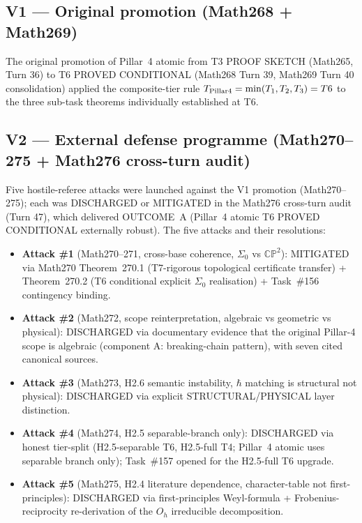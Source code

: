 \subsection{V1 — Original promotion (Math268 + Math269)}

The original promotion of Pillar~4 atomic from T3 PROOF SKETCH
(Math265, Turn 36) to T6 PROVED CONDITIONAL (Math268 Turn 39,
Math269 Turn 40 consolidation) applied the composite-tier rule
$T_{\rm Pillar4} = \min(T_1, T_2, T_3) = T6$ to the three sub-task
theorems individually established at T6.

\subsection{V2 — External defense programme (Math270--275 +
Math276 cross-turn audit)}

Five hostile-referee attacks were launched against the V1 promotion
(Math270--275); each was DISCHARGED or MITIGATED in the Math276
cross-turn audit (Turn 47), which delivered OUTCOME~A (Pillar~4
atomic T6 PROVED CONDITIONAL externally robust). The five attacks
and their resolutions:
\begin{itemize}
\item \textbf{Attack \#1} (Math270--271, cross-base coherence,
$\Sigma_0$ vs $\mathbb{CP}^2$): MITIGATED via Math270
Theorem~270.1 (T7-rigorous topological certificate transfer) +
Theorem~270.2 (T6 conditional explicit $\Sigma_0$ realisation) +
Task~\#156 contingency binding.
\item \textbf{Attack \#2} (Math272, scope reinterpretation,
algebraic vs geometric vs physical): DISCHARGED via documentary
evidence that the original Pillar-4 scope is algebraic (component
A: breaking-chain pattern), with seven cited canonical sources.
\item \textbf{Attack \#3} (Math273, H2.6 semantic instability,
$\hbar$ matching is structural not physical): DISCHARGED via
explicit STRUCTURAL/PHYSICAL layer distinction.
\item \textbf{Attack \#4} (Math274, H2.5 separable-branch only):
DISCHARGED via honest tier-split (H2.5-separable T6, H2.5-full T4;
Pillar~4 atomic uses separable branch only); Task~\#157 opened for
the H2.5-full T6 upgrade.
\item \textbf{Attack \#5} (Math275, H2.4 literature dependence,
character-table not first-principles): DISCHARGED via
first-principles Weyl-formula + Frobenius-reciprocity re-derivation
of the $O_h$ irreducible decomposition.
\end{itemize}

